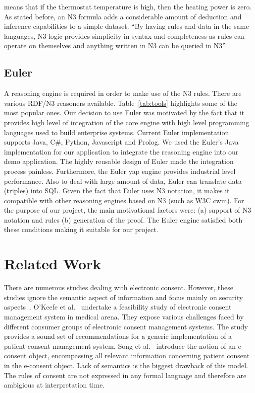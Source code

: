 \documentclass[conference]{IEEEtran}
\begin{document}
means that if the thermostat temperature is high, then the heating power is zero. As stated before, an N3 formula adds a considerable amount of deduction and
inference capabilities to a simple dataset.  ``By having rules and data in the same
languages, N3 logic provides simplicity in syntax and completeness as rules can operate on themselves and anything written in N3 can be queried in N3''~\cite{berners-lee2008}.


\subsection{Euler}

A reasoning engine is required in order to make use of the N3 rules. There are various RDF/N3 reasoners available. Table~\ref{tab:tools} highlights some of
the most popular ones. Our decision to use Euler was motivated by the fact that it provides high level of integration of the core engine with high level
programming languages used to build enterprise systems.  Current Euler implementation supports Java, C\#, Python, Javascript and Prolog.  We used the Euler's
Java implementation for our application to integrate the reasoning engine into our demo application.  The highly reusable design of Euler made the integration
process painless. Furthermore, the Euler yap engine provides industrial level performance. Also to deal with large amount of data, Euler can translate data
(triples) into SQL. Given the fact that Euler uses N3 notation, it makes it compatible with other reasoning engines based on N3 (such as W3C cwm).  For the
purpose of our project, the main motivational factors were: (a) support of N3 notation and rules (b) generation of the proof. The Euler engine satisfied both
these conditions making it suitable for our project.



\section{Related Work}
\label{rel-work}

There are numerous studies dealing with electronic consent. However, these studies ignore the semantic aspect of information and focus
mainly on security aspects~\cite{reid2003, chen2009identity, blobel2004authorisation}. O'Keefe et al.~\cite{okeefe2002implementation} undertake a feasibility
study of electronic consent management system in medical arena. They expose various challenges faced by different consumer groups of electronic consent
management systems.  The study provides a sound set of recommendations for a generic implementation of a patient consent management system.
Song et al.~\cite{song2002patient} introduce the notion of an e-consent object, encompassing all relevant information concerning patient consent in the
e-consent object. Lack of semantics is the biggest drawback of this model.  The rules of consent are not expressed in any formal language and therefore are
ambigious at interpretation time.
\end{document}

